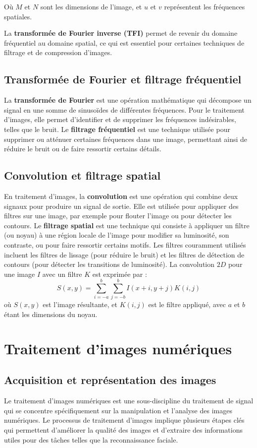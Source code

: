 \documentclass[a4paper,12pt]{report}
\begin{document}
Où $M$ et $N$ sont les dimensions de l'image, et $u$ et $v$ représentent les fréquences spatiales.

La \textbf{transformée de Fourier inverse (TFI)} permet de revenir du domaine fréquentiel au domaine spatial, ce qui est essentiel pour certaines techniques de filtrage et de compression d'images.

\subsection{Transformée de Fourier et filtrage fréquentiel}
La \textbf{transformée de Fourier} est une opération mathématique qui décompose un signal en une somme de sinusoïdes de différentes fréquences. Pour le traitement d’images, elle permet d’identifier et de supprimer les fréquences indésirables, telles que le bruit. Le \textbf{filtrage fréquentiel} est une technique utilisée pour supprimer ou atténuer certaines fréquences dans une image, permettant ainsi de réduire le bruit ou de faire ressortir certains détails.

\subsection{Convolution et filtrage spatial}
En traitement d’images, la \textbf{convolution} est une opération qui combine deux signaux pour produire un signal de sortie. Elle est utilisée pour appliquer des filtres sur une image, par exemple pour flouter l’image ou pour détecter les contours. Le \textbf{filtrage spatial} est une technique qui consiste à appliquer un filtre (ou noyau) à une région locale de l'image pour modifier sa luminosité, son contraste, ou pour faire ressortir certains motifs. Les filtres couramment utilisés incluent les filtres de lissage (pour réduire le bruit) et les filtres de détection de contours (pour détecter les transitions de luminosité).
La convolution $2D$ pour une image $I$ avec un filtre $K$ est exprimée par :
\[S(x,y) = \sum_{i=-a}^{b} \sum_{j=-b}^{b} I(x+i, y+j) K(i,j)
\]
où $S(x,y)$ est l'image résultante, et $K(i,j)$ est le filtre appliqué, avec $a$ et $b$ étant les dimensions du noyau.

\section{Traitement d'images numériques}
\subsection{Acquisition et représentation des images}
Le traitement d'images numériques est une sous-discipline du traitement de signal qui se concentre spécifiquement sur la manipulation et l'analyse des images numériques. Le processus de traitement d'images implique plusieurs étapes clés qui permettent d'améliorer la qualité des images et d'extraire des informations utiles pour des tâches telles que la reconnaissance faciale.
\end{document}
